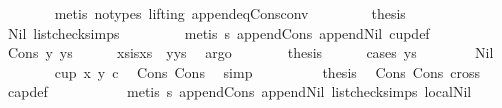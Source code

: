 \begin{isabellebody}
\ \ \ \ \ \ \isamarkupfalse%
\ {\isacharparenleft}{\kern0pt}metis\ {\isacharparenleft}{\kern0pt}no{\isacharunderscore}{\kern0pt}types{\isacharcomma}{\kern0pt}\ lifting{\isacharparenright}{\kern0pt}\ append{\isacharunderscore}{\kern0pt}eq{\isacharunderscore}{\kern0pt}Cons{\isacharunderscore}{\kern0pt}conv{\isacharparenright}{\kern0pt}\ \isanewline
\ \ \ \ \isamarkupfalse%
\ \isamarkupfalse%
\ {\isacharquery}{\kern0pt}thesis\ \isamarkupfalse%
\ Nil\ list{\isacharunderscore}{\kern0pt}check{\isachardot}{\kern0pt}simps{\isacharparenleft}{\kern0pt}{}{\isacharparenright}{\kern0pt}\ \isanewline
\ \ \ \ \ \ \isamarkupfalse%
\ {\isacharparenleft}{\kern0pt}metis\ s{}\ append{\isacharunderscore}{\kern0pt}Cons\ append{\isacharunderscore}{\kern0pt}Nil\ cup{}{\isacharunderscore}{\kern0pt}def{\isacharparenright}{\kern0pt}\ \isanewline
\ \ \isamarkupfalse%
\isanewline
\ \ \ \ \isamarkupfalse%
\ {\isacharparenleft}{\kern0pt}Cons\ y\ ys{\isacharparenright}{\kern0pt}\isanewline
\ \ \ \ \isamarkupfalse%
\ xs{\isacharunderscore}{\kern0pt}is{\isacharcolon}{\kern0pt}{\isachardoublequoteopen}xs\ {\isacharequal}{\kern0pt}\ y{\isacharhash}{\kern0pt}ys{\isachardoublequoteclose}\ \isamarkupfalse%
\ argo\isanewline
\ \ \ \ \isamarkupfalse%
\ \isamarkupfalse%
\ {\isacharquery}{\kern0pt}thesis\ \isanewline
\ \ \ \ \isamarkupfalse%
{\isacharparenleft}{\kern0pt}cases\ ys{\isacharparenright}{\kern0pt}\isanewline
\ \ \ \ \ \ \isamarkupfalse%
\ Nil\isanewline
\ \ \ \ \ \ \isamarkupfalse%
\ {\isachardoublequoteopen}cup{}\ x\ y\ c{\isachardoublequoteclose}\ \isamarkupfalse%
\ Cons\ Cons{}\ \isamarkupfalse%
\ simp\isanewline
\ \ \ \ \ \ \isamarkupfalse%
\ \isamarkupfalse%
\ {\isacharquery}{\kern0pt}thesis\ \isamarkupfalse%
\ Cons\ Cons{}\ cross{}\ \isamarkupfalse%
\ cap{}{\isacharunderscore}{\kern0pt}def\ \isanewline
\ \ \ \ \ \ \ \ \isamarkupfalse%
\ {\isacharparenleft}{\kern0pt}metis\ s{}\ append{\isacharunderscore}{\kern0pt}Cons\ append{\isacharunderscore}{\kern0pt}Nil\ list{\isacharunderscore}{\kern0pt}check{\isachardot}{\kern0pt}simps{\isacharparenleft}{\kern0pt}{}{\isacharparenright}{\kern0pt}\ local{\isachardot}{\kern0pt}Nil{\isacharparenright}{\kern0pt}\ \isanewline

\end{isabellebody}
